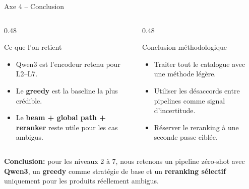 \documentclass[11pt,aspectratio=169]{beamer}
\begin{document}
\begin{frame}{Axe 4 -- Conclusion}
\small
\begin{columns}
\begin{column}{0.48\textwidth}
\begin{block}{Ce que l'on retient}
\begin{itemize}
    \item Qwen3 est l'encodeur retenu pour L2--L7.
    \item Le \textbf{greedy} est la baseline la plus crédible.
    \item Le \textbf{beam + global path + reranker} reste utile pour les cas ambigus.
\end{itemize}
\end{block}
\end{column}

\begin{column}{0.48\textwidth}
\begin{block}{Conclusion méthodologique}
\begin{itemize}
    \item Traiter tout le catalogue avec une méthode légère.
    \item Utiliser les désaccords entre pipelines comme signal d'incertitude.
    \item Réserver le reranking à une seconde passe ciblée.
\end{itemize}
\end{block}
\end{column}
\end{columns}

\vspace{0.35cm}

\begin{takeawaybox}
\centering
\textbf{Conclusion:} pour les niveaux 2 à 7, nous retenons un pipeline zéro-shot avec \textbf{Qwen3}, un \textbf{greedy} comme stratégie de base et un \textbf{reranking sélectif} uniquement pour les produits réellement ambigus.
\end{takeawaybox}
\end{frame}
\end{document}
